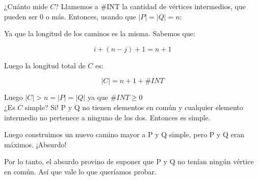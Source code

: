 \documentclass{article}
\begin{document}
¿Cuánto mide $C$? Llamemos a \#INT la cantidad de vértices intermedios, que pueden ser 0 o más. Entonces, usando que $|P| = |Q| = n$:

Ya que la longitud de los caminos es la misma. Sabemos que:  

\[ i + (n - j) + 1 = n + 1 \]

Luego la longitud total de $C$ es:

\[ |C| = n + 1 + \#INT \]

Luego $|C| > n = |P| = |Q|$ ya que  $ \#INT \ge 0$\\ 
¿Es $C$ simple? Si! P y Q no tienen elementos en común y cualquier elemento intermedio no pertenece a ninguno de los dos. Entonces es simple.

Luego construimos un nuevo camino mayor a P y Q simple, pero P y Q eran máximos. ¡Absurdo!

Por lo tanto, el absurdo provino de suponer que P y Q no tenían ningún vértice en común. Así que vale lo que queríamos probar.
\end{document}
